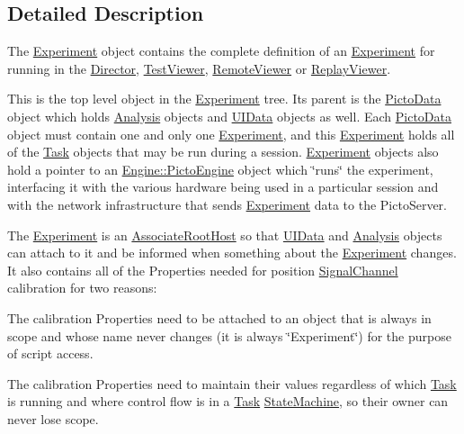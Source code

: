 \subsection{Detailed Description}
The \hyperlink{class_picto_1_1_experiment}{Experiment} object contains the complete definition of an \hyperlink{class_picto_1_1_experiment}{Experiment} for running in the \hyperlink{class_director}{Director}, \hyperlink{class_test_viewer}{Test\-Viewer}, \hyperlink{class_remote_viewer}{Remote\-Viewer} or \hyperlink{class_replay_viewer}{Replay\-Viewer}. 

This is the top level object in the \hyperlink{class_picto_1_1_experiment}{Experiment} tree. Its parent is the \hyperlink{class_picto_1_1_picto_data}{Picto\-Data} object which holds \hyperlink{class_picto_1_1_analysis}{Analysis} objects and \hyperlink{class_picto_1_1_u_i_data}{U\-I\-Data} objects as well. Each \hyperlink{class_picto_1_1_picto_data}{Picto\-Data} object must contain one and only one \hyperlink{class_picto_1_1_experiment}{Experiment}, and this \hyperlink{class_picto_1_1_experiment}{Experiment} holds all of the \hyperlink{class_picto_1_1_task}{Task} objects that may be run during a session. \hyperlink{class_picto_1_1_experiment}{Experiment} objects also hold a pointer to an \hyperlink{class_picto_1_1_engine_1_1_picto_engine}{Engine\-::\-Picto\-Engine} object which \char`\"{}runs\char`\"{} the experiment, interfacing it with the various hardware being used in a particular session and with the network infrastructure that sends \hyperlink{class_picto_1_1_experiment}{Experiment} data to the Picto\-Server.

The \hyperlink{class_picto_1_1_experiment}{Experiment} is an \hyperlink{class_picto_1_1_associate_root_host}{Associate\-Root\-Host} so that \hyperlink{class_picto_1_1_u_i_data}{U\-I\-Data} and \hyperlink{class_picto_1_1_analysis}{Analysis} objects can attach to it and be informed when something about the \hyperlink{class_picto_1_1_experiment}{Experiment} changes. It also contains all of the Properties needed for position \hyperlink{class_picto_1_1_signal_channel}{Signal\-Channel} calibration for two reasons\-:
\begin{DoxyItemize}
\item The calibration Properties need to be attached to an object that is always in scope and whose name never changes (it is always \char`\"{}\-Experiment\char`\"{}) for the purpose of script access.
\item The calibration Properties need to maintain their values regardless of which \hyperlink{class_picto_1_1_task}{Task} is running and where control flow is in a \hyperlink{class_picto_1_1_task}{Task} \hyperlink{class_picto_1_1_state_machine}{State\-Machine}, so their owner can never lose scope.
\end{DoxyItemize}

